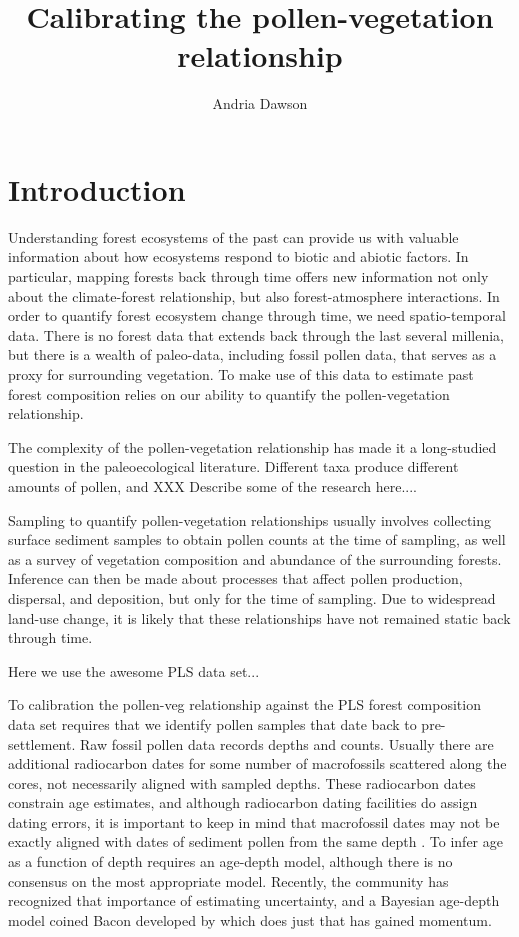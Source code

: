 \documentclass[12pt]{article}
\begin{document}
\nocite{*}

\title{Calibrating the pollen-vegetation relationship}

\author{Andria Dawson}

\maketitle

\section{Introduction}

Understanding forest ecosystems of the past can provide us with
valuable information about how ecosystems respond to biotic and
abiotic factors. In particular, mapping forests back through time
offers new information not only about the climate-forest relationship,
but also forest-atmosphere interactions. In order to quantify forest
ecosystem change through time, we need spatio-temporal data. There is
no forest data that extends back through the last several millenia,
but there is a wealth of paleo-data, including fossil pollen data,
that serves as a proxy for surrounding vegetation. To make use of this
data to estimate past forest composition relies on our ability to
quantify the pollen-vegetation relationship. 

The complexity of the pollen-vegetation relationship has made it a
long-studied question in the paleoecological literature. Different
taxa produce different amounts of pollen, and XXX Describe some of the
research here....

Sampling to quantify pollen-vegetation relationships usually involves
collecting surface sediment samples to obtain pollen counts at the
time of sampling, as well as a survey of vegetation composition and
abundance of the surrounding forests. Inference can then be made about
processes that affect pollen production, dispersal, and deposition,
but only for the time of sampling. Due to widespread land-use change,
it is likely that these relationships have not remained static back
through time.

Here we use the awesome PLS data set...

To calibration the pollen-veg relationship against the PLS forest
composition data set requires that we identify pollen samples that
date back to pre-settlement. Raw fossil pollen data records depths and
counts. Usually there are additional radiocarbon dates for some number
of macrofossils scattered along the cores, not necessarily aligned
with sampled depths. These radiocarbon dates constrain age estimates,
and although radiocarbon dating facilities do assign dating errors, it
is important to keep in mind that macrofossil dates may not be exactly
aligned with dates of sediment pollen from the same depth
\cite{XXX}. To infer age as a function of depth requires an age-depth
model, although there is no consensus on the most appropriate
model. Recently, the community has recognized that importance of
estimating uncertainty, and a Bayesian age-depth model coined Bacon
developed by \cite{XXX }which does just that has gained momentum.
  
\end{document}
